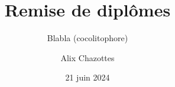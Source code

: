 \documentclass{beamer}
\title[Remise de diplômes]{Remise de diplômes}
\subtitle{Blabla (cocolitophore)}
\author{Alix Chazottes}
\institute{CentraleSupélec}
\date{21 juin 2024}
\begin{document}
\begin{frame}
  \titlepage
\end{frame}

%
%

\end{document}
